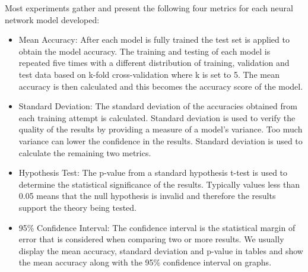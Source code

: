 Most experiments gather and present the following four metrics for each neural network model developed:
\begin{itemize}
	\item Mean Accuracy: After each model is fully trained the test set is applied to obtain the model accuracy. The training and testing of each model is repeated five times with a different distribution of training, validation and test data based on k-fold cross-validation where k is set to 5. The mean accuracy is then calculated and this becomes the accuracy score of the model.
	\item Standard Deviation: The standard deviation of the accuracies obtained from each training attempt is calculated. Standard deviation is used to verify the quality of the results by providing a measure of a model's variance. Too much variance can lower the confidence in the results. Standard deviation is used to calculate the remaining two metrics.
	\item Hypothesis Test: The p-value from a standard hypothesis t-test is used to determine the statistical significance of the results. Typically values less than 0.05 means that the null hypothesis is invalid and therefore the results support the theory being tested.
	\item 95\% Confidence Interval: The confidence interval is the statistical margin of error that is considered when comparing two or more results.
	We usually display the mean accuracy, standard deviation and p-value in tables and show the mean accuracy along with the 95\% confidence interval on graphs.
\end{itemize}
